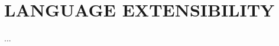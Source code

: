 \documentclass[../report.tex]{subfiles}
\begin{document}
\section{LANGUAGE EXTENSIBILITY}

...
\end{document}
